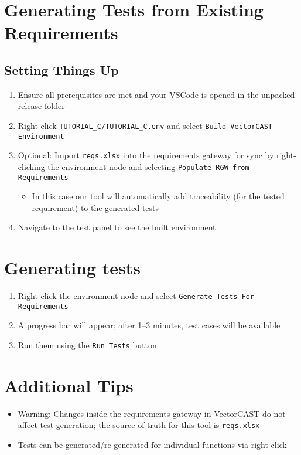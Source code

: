 \section*{Generating Tests from Existing Requirements}
\subsection*{Setting Things Up}
\begin{enumerate}
  \item Ensure all prerequisites are met and your VSCode is opened in the unpacked release folder
  \item Right click \texttt{TUTORIAL\_C/TUTORIAL\_C.env} and select \texttt{Build VectorCAST Environment}
  \item Optional: Import \texttt{reqs.xlsx} into the requirements gateway for sync by right-clicking the environment
  node and selecting \texttt{Populate RGW from Requirements}
    \begin{itemize}
      \item In this case our tool will automatically add traceability (for the tested requirement) to the
      generated tests
    \end{itemize}
  \item Navigate to the test panel to see the built environment
\end{enumerate}
\section*{Generating tests}
\begin{enumerate}
  \item Right-click the environment node and select \texttt{Generate Tests For Requirements}
  \item A progress bar will appear; after 1–3 minutes, test cases will be available
  \item Run them using the \texttt{Run Tests} button
\end{enumerate}
\section*{Additional Tips}
\begin{itemize}
  \item Warning: Changes inside the requirements gateway in VectorCAST do not affect test generation;
  the source of truth for this tool is \texttt{reqs.xlsx}
  \item Tests can be generated/re-generated for individual functions via right-click
\end{itemize}